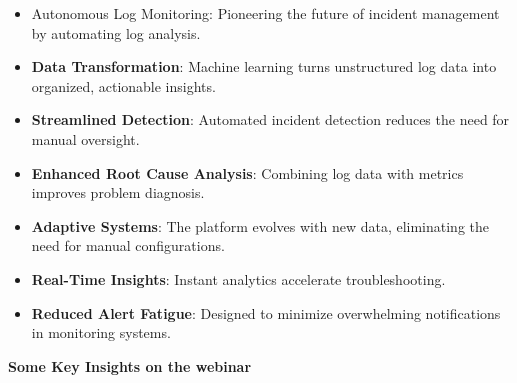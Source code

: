 \begin{itemize}
    \item Autonomous Log Monitoring: Pioneering the future of incident management by automating log analysis.
  
    \item \textbf{Data Transformation}: Machine learning turns unstructured log data into organized, actionable insights.

    \item \textbf{Streamlined Detection}: Automated incident detection reduces the need for manual oversight.

    \item \textbf{Enhanced Root Cause Analysis}: Combining log data with metrics improves problem diagnosis.
 
    \item \textbf{Adaptive Systems}: The platform evolves with new data, eliminating the need for manual configurations.
 
    \item \textbf{Real-Time Insights}: Instant analytics accelerate troubleshooting.

  
    \item \textbf{Reduced Alert Fatigue}: Designed to minimize overwhelming notifications in monitoring systems.

\end{itemize}


\textbf{Some Key Insights on the webinar}


